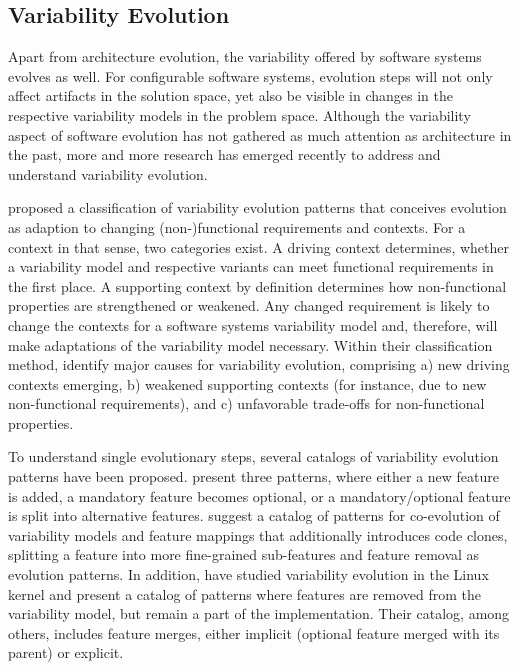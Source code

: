 \subsection{Variability Evolution}
Apart from architecture evolution, the variability offered by software systems
evolves as well. For configurable software systems,
evolution steps will not only affect artifacts in the solution space, yet also
be visible in changes in the respective variability models in the problem space.
Although the variability aspect of software evolution has not gathered as
much attention as architecture in the past, more and more
research has emerged recently to address and understand variability evolution.

\cite{peng_analyzing_2011} proposed a classification of variability evolution patterns that
conceives evolution as adaption to changing (non-)functional requirements and
contexts. For a context in that sense, two categories exist. A driving context
determines, whether a variability model and respective variants can meet
functional requirements in the first place. A supporting context by definition
determines how non-functional properties are strengthened or weakened. 
Any changed requirement is likely to change the contexts for a software systems
variability model and, therefore, will make adaptations of the variability
model necessary. Within their classification method, \cite{peng_analyzing_2011} identify major
causes for variability evolution, comprising a) new driving contexts emerging, b) weakened supporting contexts (for instance, due to new
non-functional requirements), and c) unfavorable trade-offs for non-functional
properties. 

To understand single evolutionary steps, several catalogs of variability
evolution patterns have been proposed. \cite{peng_analyzing_2011} present three patterns,
where either a new feature is added, a mandatory feature becomes optional, or a
mandatory/optional feature is split into alternative features. \cite{seidl_co-evolution_2012} suggest a catalog of
patterns for co-evolution of variability models and feature mappings that additionally introduces code clones, splitting a feature
into more fine-grained sub-features and feature removal as evolution patterns.
In addition, \cite{passos_towards_2012} have studied variability evolution in
the Linux kernel and present a catalog of patterns where features are removed from the
variability model, but remain a part of the implementation. Their
catalog, among others, includes feature merges, either implicit (optional feature merged
with its parent) or explicit.

